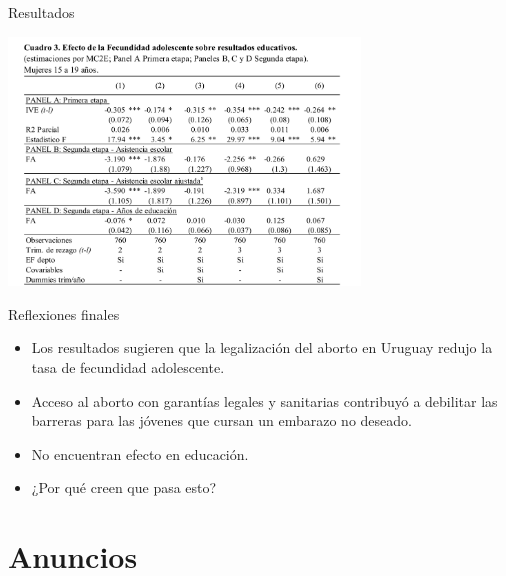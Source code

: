 \documentclass[11pt, aspectratio=169, compress]{beamer}
\begin{document}
\begin{frame}[t]{Resultados}
\vspace*{-2ex}
\begin{center}
	\includegraphics[width=0.7\textwidth]{tab3}
\end{center}
\end{frame}
\begin{frame}[t]{Reflexiones finales}
\begin{itemize}
	\item Los resultados sugieren que la legalización del aborto en Uruguay redujo la tasa de
	fecundidad adolescente. 
	\item Acceso al aborto con garantías legales y sanitarias contribuyó a debilitar las
	barreras para las jóvenes que cursan un embarazo no deseado. 
	\item No encuentran efecto en educación. 
	\item ¿Por qué creen que pasa esto? 
\end{itemize}
\end{frame}
\section{Anuncios}
\end{document}

